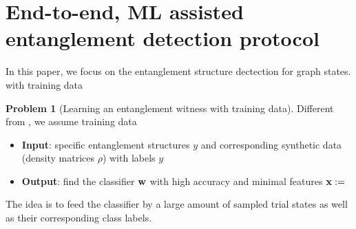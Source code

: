 \documentclass[
reprint,
aps,
pra,
floatfix,
]{revtex4-2}
\theoremstyle{plain}
\theoremstyle{definition}
\newtheorem{problem}{Problem}
\newcommand{\dm}{\rho}
\begin{document}
\section{End-to-end, ML assisted entanglement detection protocol}

In this paper, we focus on the entanglement structure dectection for graph states.
with training data
\begin{problem}[Learning an entanglement witness with training data]
	Different from , we assume training data
	\begin{itemize}
		\item \textbf{Input}: specific entanglement structures $y$ and corresponding synthetic data (density matrices $\dm$) with labels $y$
		\item \textbf{Output}: find the classifier $\vb{w}$ with high accuracy and minimal features $\vb{x}:=$
	\end{itemize}
\end{problem}
The idea is to feed the classifier by a large amount of sampled trial states
as well as their corresponding class labels.



\end{document}
